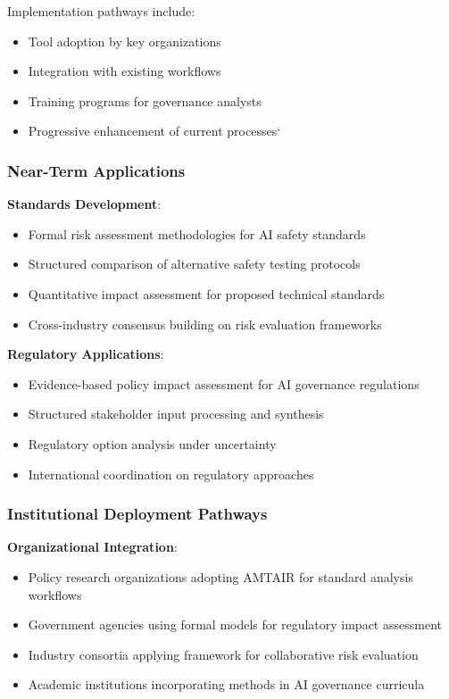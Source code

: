 \documentclass[
  11pt,
  letterpaper,
]{book}
\providecommand{\tightlist}{%
  \setlength{\itemsep}{0pt}\setlength{\parskip}{0pt}}
\begin{document}
Implementation pathways include:

\begin{itemize}
\tightlist
\item
  Tool adoption by key organizations
\item
  Integration with existing workflows
\item
  Training programs for governance analysts
\item
  Progressive enhancement of current processes`
\end{itemize}

\subsubsection{Near-Term Applications}\label{sec-near-term-applications}

\textbf{Standards Development}:

\begin{itemize}
\tightlist
\item
  Formal risk assessment methodologies for AI safety standards
\item
  Structured comparison of alternative safety testing protocols
\item
  Quantitative impact assessment for proposed technical standards
\item
  Cross-industry consensus building on risk evaluation frameworks
\end{itemize}

\textbf{Regulatory Applications}:

\begin{itemize}
\tightlist
\item
  Evidence-based policy impact assessment for AI governance regulations
\item
  Structured stakeholder input processing and synthesis
\item
  Regulatory option analysis under uncertainty
\item
  International coordination on regulatory approaches
\end{itemize}

\subsubsection{Institutional Deployment
Pathways}\label{sec-deployment-pathways}

\textbf{Organizational Integration}:

\begin{itemize}
\tightlist
\item
  Policy research organizations adopting AMTAIR for standard analysis
  workflows
\item
  Government agencies using formal models for regulatory impact
  assessment
\item
  Industry consortia applying framework for collaborative risk
  evaluation
\item
  Academic institutions incorporating methods in AI governance curricula
\end{itemize}
\end{document}
